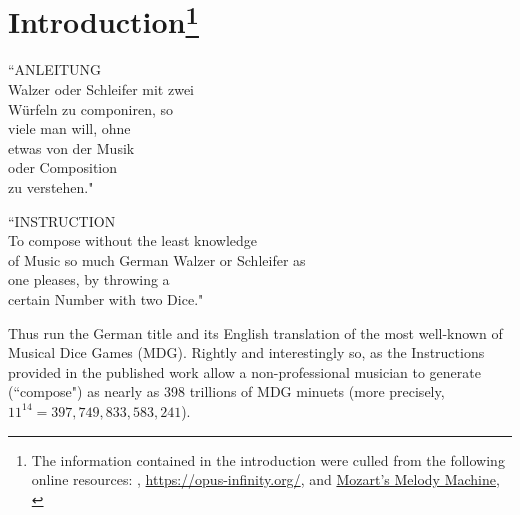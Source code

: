 \documentclass[letterpaper,x11names,svgnames,10pt]{article}
\begin{document}
{\section[Introduction]{Introduction\footnote{The information contained in the introduction were culled from the following online resources:
	\citet{wiki_mw2017},
	\url{https://opus-infinity.org/}, and \hyperref{https://www.sciencenews.org/article/mozarts-melody-machine-0}{}{}{Mozart's Melody Machine},
	\citep*{peterson2001}
	}
}
	\begin{center}
	\begin{minipage}{0.4\textwidth}
	\begin{flushleft}
		\begin{center}
			``ANLEITUNG\\
			Walzer oder Schleifer mit zwei\\
			W\"{u}rfeln zu componiren, so\\
			viele man will, ohne\\
			etwas von der Musik\\
			oder Composition\\
			zu verstehen."\\
		\end{center}
	\end{flushleft}
	\end{minipage}
	\begin{minipage}{0.4\textwidth}
	\begin{flushright}
		\begin{center}
		``INSTRUCTION\\
		To compose without the least knowledge\\
		of Music so much German Walzer or Schleifer as\\
		one pleases, by throwing a\\
		certain Number with two Dice."
	\end{center}
	\end{flushright}
	\end{minipage}
	\end{center}

Thus run the German title and its English translation of the most well-known of Musical Dice Games (MDG).  Rightly and interestingly so, as the Instructions provided in the published work allow a non-professional musician to generate (``compose") as nearly as 398 trillions of MDG minuets (more precisely, $11^{14} = 397,749,833,583,241$).\\  

}
\end{document}

